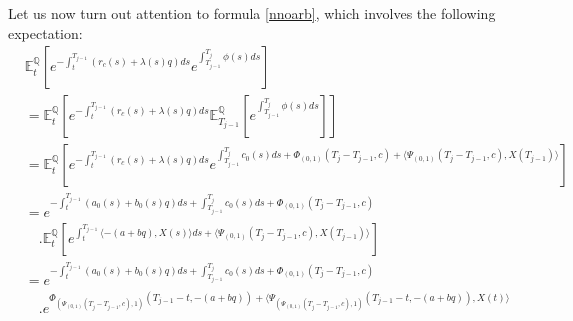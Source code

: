 \documentclass[12pt,a4paper]{article}
\theoremstyle{plain}
\numberwithin{equation}{section}
\begin{document}
Let us now turn out attention to formula \eqref{nnoarb}, which involves the following expectation:
\begin{align}
&\mathbb{E}_t^\mathbb{Q}\left[e^{-\int_{t}^{T_{j-1}}(r_c(s)+\lambda(s)q)ds}e^{\int_{T_{j-1}}^{T_{j}}\phi (s)ds}\right]  \nonumber\\
&=\mathbb{E}_t^\mathbb{Q}\left[e^{-\int_{t}^{T_{j-1}}(r_c(s)+\lambda(s)q)ds}\mathbb{E}_{T_{j-1}}^\mathbb{Q}\left[e^{\int_{T_{j-1}}^{T_{j}}\phi (s)ds}\right]\right]  \nonumber\\
& =\mathbb{E}_t^\mathbb{Q}\left[e^{-\int_{t}^{T_{j-1}}(r_c(s)+\lambda(s)q)ds}e^{\int_{T_{j-1}}^{T_{j}}c_0(s)ds+\Phi_{(0,1)}(T_{j}-T_{j-1},c)+\langle \Psi_{(0,1)}(T_{j}-T_{j-1},c),X(T_{j-1})\rangle}
 \right]  \nonumber\\
&=e^{-\int_t^{T_{j-1}}(a_0(s)+b_0(s)q)ds +\int_{T_{j-1}}^{T_{j}}c_0(s)ds+\Phi_{(0,1)}(T_{j}-T_{j-1},c)}\nonumber\\
&\quad .\mathbb{E}_t^\mathbb{Q}\left[e^{\int_t^{T_{j-1}}\langle -(a+bq), X(s)\rangle ds +\langle \Psi_{(0,1)}(T_{j}-T_{j-1},c) , X(T_{j-1})\rangle }\right]\nonumber\\
&=e^{-\int_t^{T_{j-1}}(a_0(s)+b_0(s)q)ds +\int_{T_{j-1}}^{T_{j}}c_0(s)ds+\Phi_{(0,1)}(T_{j}-T_{j-1},c)}\nonumber\\
&\quad . e^{\Phi_{(\Psi_{(0,1)}(T_{j}-T_{j-1},c),1)}(T_{j-1}-t,-(a+bq))+\langle
\Psi_{(\Psi_{(0,1)}(T_{j}-T_{j-1},c),1)}(T_{j-1}-t,-(a+bq)),X(t)\rangle}
\end{align}
\end{document}
